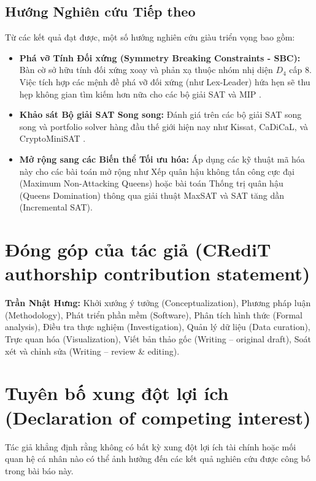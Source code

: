 \documentclass[a4paper,fleqn]{cas-sc}
\begin{document}
\subsection{Hướng Nghiên cứu Tiếp theo}
Từ các kết quả đạt được, một số hướng nghiên cứu giàu triển vọng bao gồm:
\begin{itemize}
    \item \textbf{Phá vỡ Tính Đối xứng (Symmetry Breaking Constraints - SBC):} Bàn cờ sở hữu tính đối xứng xoay và phản xạ thuộc nhóm nhị diện $D_4$ cấp 8. Việc tích hợp các mệnh đề phá vỡ đối xứng (như Lex-Leader) hứa hẹn sẽ thu hẹp không gian tìm kiếm hơn nữa cho các bộ giải SAT và MIP \cite{crawford1996symmetry}.
    \item \textbf{Khảo sát Bộ giải SAT Song song:} Đánh giá trên các bộ giải SAT song song và portfolio solver hàng đầu thế giới hiện nay như Kissat, CaDiCaL, và CryptoMiniSAT \cite{biere2009handbook}.
    \item \textbf{Mở rộng sang các Biến thể Tối ưu hóa:} Áp dụng các kỹ thuật mã hóa này cho các bài toán mở rộng như Xếp quân hậu không tấn công cực đại (Maximum Non-Attacking Queens) hoặc bài toán Thống trị quân hậu (Queens Domination) thông qua giải thuật MaxSAT và SAT tăng dần (Incremental SAT).
\end{itemize}

\section*{Đóng góp của tác giả (CRediT authorship contribution statement)}
\textbf{Trần Nhật Hưng:} Khởi xướng ý tưởng (Conceptualization), Phương pháp luận (Methodology), Phát triển phần mềm (Software), Phân tích hình thức (Formal analysis), Điều tra thực nghiệm (Investigation), Quản lý dữ liệu (Data curation), Trực quan hóa (Visualization), Viết bản thảo gốc (Writing -- original draft), Soát xét và chỉnh sửa (Writing -- review \& editing).

\section*{Tuyên bố xung đột lợi ích (Declaration of competing interest)}
Tác giả khẳng định rằng không có bất kỳ xung đột lợi ích tài chính hoặc mối quan hệ cá nhân nào có thể ảnh hưởng đến các kết quả nghiên cứu được công bố trong bài báo này.
\end{document}
